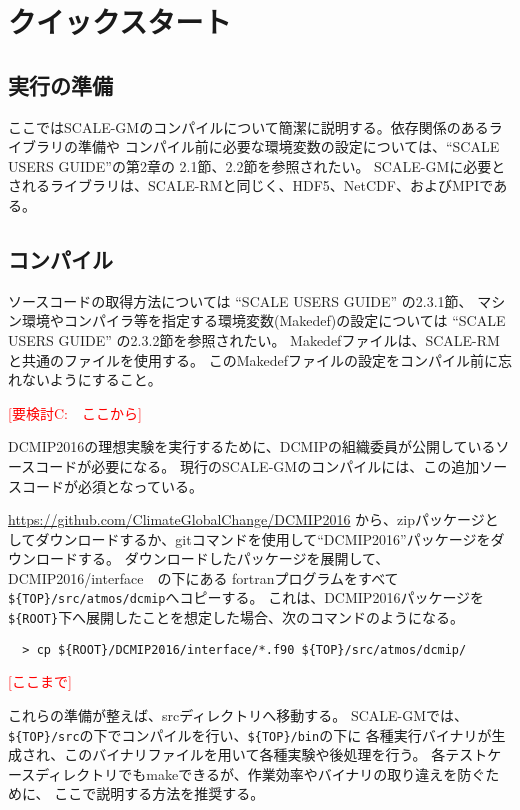 \section{クイックスタート}

\subsection{実行の準備}
ここではSCALE-GMのコンパイルについて簡潔に説明する。依存関係のあるライブラリの準備や
コンパイル前に必要な環境変数の設定については、``SCALE USERS GUIDE''の第2章の
2.1節、2.2節を参照されたい。
SCALE-GMに必要とされるライブラリは、SCALE-RMと同じく、HDF5、NetCDF、およびMPIである。

\subsection{コンパイル}
ソースコードの取得方法については ``SCALE USERS GUIDE'' の2.3.1節、
マシン環境やコンパイラ等を指定する環境変数(Makedef)の設定については
 ``SCALE USERS GUIDE'' の2.3.2節を参照されたい。
Makedefファイルは、SCALE-RMと共通のファイルを使用する。
このMakedefファイルの設定をコンパイル前に忘れないようにすること。

\textcolor{red}{[要検討C:　ここから]}

DCMIP2016の理想実験を実行するために、DCMIPの組織委員が公開しているソースコードが必要になる。
現行のSCALE-GMのコンパイルには、この追加ソースコードが必須となっている。

\url{https://github.com/ClimateGlobalChange/DCMIP2016}
から、zipパッケージとしてダウンロードするか、gitコマンドを使用して``DCMIP2016''パッケージをダウンロードする。
ダウンロードしたパッケージを展開して、DCMIP2016/interface　の下にある
fortranプログラムをすべて\verb|${TOP}/src/atmos/dcmip|へコピーする。
これは、DCMIP2016パッケージを\verb|${ROOT}|下へ展開したことを想定した場合、次のコマンドのようになる。
\begin{verbatim}
  > cp ${ROOT}/DCMIP2016/interface/*.f90 ${TOP}/src/atmos/dcmip/
\end{verbatim}

\textcolor{red}{[ここまで]}

これらの準備が整えば、srcディレクトリへ移動する。
SCALE-GMでは、\verb|${TOP}/src|の下でコンパイルを行い、\verb|${TOP}/bin|の下に
各種実行バイナリが生成され、このバイナリファイルを用いて各種実験や後処理を行う。
各テストケースディレクトリでもmakeできるが、作業効率やバイナリの取り違えを防ぐために、
ここで説明する方法を推奨する。

